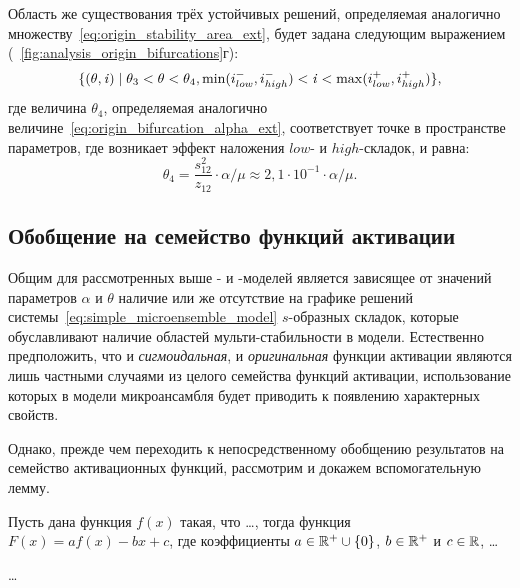 Область же существования трёх устойчивых решений, определяемая аналогично множеству~\eqref{eq:origin_stability_area_ext}, будет задана следующим выражением (\seefigure~\ref{fig:analysis_origin_bifurcations}г):
\begin{equation}
    \nonumber
    \{ (\theta, \mathit{i}) \mid \theta_{3} < \theta < \theta_{4}, \min(i^{-}_{low}, i^{-}_{high}) < \mathit{i} < \max(i^{+}_{low}, i^{+}_{high}) \},
\end{equation}
где величина $\theta_{4}$, определяемая аналогично величине~\eqref{eq:origin_bifurcation_alpha_ext}, соответствует точке в пространстве параметров, где возникает эффект наложения $low$- и $high$-складок, и равна:
\begin{equation}
    \nonumber
    \theta_{4} = \dfrac{s_{12}^{2}}{z_{12}} \cdot \alpha / \mu \approx 2,1 \cdot 10^{-1} \cdot \alpha / \mu.
\end{equation}


\subsection{Обобщение на семейство функций активации}  \label{subsection:analysis_custom}

Общим для рассмотренных выше - и -моделей является зависящее от значений параметров $\alpha$ и $\theta$ наличие или же отсутствие на графике решений системы~\eqref{eq:simple_microensemble_model} $s$-образных складок, которые обуславливают наличие областей мульти-стабильности в модели. Естественно предположить, что и \textit{сигмоидальная}, и \textit{оригинальная} функции активации являются лишь частными случаями из целого семейства функций активации, использование которых в модели микроансамбля будет приводить к появлению характерных свойств.

Однако, прежде чем переходить к непосредственному обобщению результатов на семейство активационных функций, рассмотрим и докажем вспомогательную лемму.
\begin{Lemma}
    Пусть дана функция $f(x)$ такая, что \ldots, тогда функция $F(x) = a f(x) - b x + c$, где коэффициенты $a \in \mathbb{R}^{+} \cup \{0\}$, $b \in \mathbb{R}^{+}$ и $c \in \mathbb{R}$, \ldots
\end{Lemma}
\begin{Proof}
    \ldots
\end{Proof}

